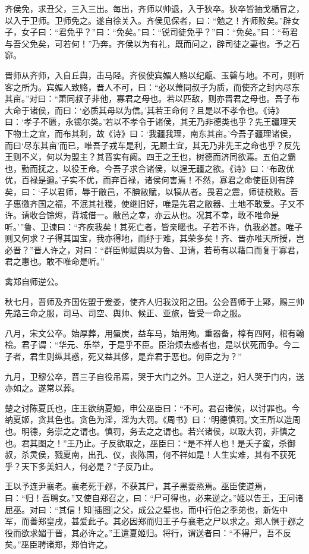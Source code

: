 \documentclass[a4paper,12pt,UTF8,twoside]{ctexbook}
\begin{document}
齐侯免，求丑父，三入三出。每出，齐师以帅退，入于狄卒。狄卒皆抽戈楯冒之，以入于卫师。卫师免之。遂自徐关入。齐侯见保者，曰：“勉之！齐师败矣。”辟女子，女子曰：“君免乎？”曰：“免矣。”曰：“锐司徒免乎？”曰：“免矣。”曰：“苟君与吾父免矣，可若何！”乃奔。齐侯以为有礼，既而问之，辟司徒之妻也。予之石窌。

晋师从齐师，入自丘舆，击马陉。齐侯使宾媚人赂以纪甗、玉磬与地。不可，则听客之所为。宾媚人致赂，晋人不可，曰：“必以萧同叔子为质，而使齐之封内尽东其亩。”对曰：“萧同叔子非他，寡君之母也。若以匹敌，则亦晋君之母也。吾子布大命于诸侯，而曰：‘必质其母以为信。’其若王命何？且是以不孝令也。《诗》曰：‘孝子不匮，永锡尔类。’若以不孝令于诸侯，其无乃非德类也乎？先王疆理天下物土之宜，而布其利，故《诗》曰：‘我疆我理，南东其亩。’今吾子疆理诸侯，而曰‘尽东其亩’而已，唯吾子戎车是利，无顾土宜，其无乃非先王之命也乎？反先王则不义，何以为盟主？其晋实有阙。四王之王也，树德而济同欲焉。五伯之霸也，勤而抚之，以役王命。今吾子求合诸侯，以逞无疆之欲。《诗》曰：‘布政优优，百禄是遒。’子实不优，而弃百禄，诸侯何害焉！不然，寡君之命使臣则有辞矣，曰：‘子以君师，辱于敝邑，不腆敝赋，以犒从者。畏君之震，师徒桡败。吾子惠徼齐国之福，不泯其社稷，使继旧好，唯是先君之敝器、土地不敢爱。子又不许。请收合馀烬，背城借一。敝邑之幸，亦云从也。况其不幸，敢不唯命是听。’”鲁、卫谏曰：“齐疾我矣！其死亡者，皆亲暱也。子若不许，仇我必甚。唯子则又何求？子得其国宝，我亦得地，而纾于难，其荣多矣！齐、晋亦唯天所授，岂必晋？”晋人许之，对曰：“群臣帅赋舆以为鲁、卫请，若苟有以藉口而复于寡君，君之惠也。敢不唯命是听。”

禽郑自师逆公。

秋七月，晋师及齐国佐盟于爰娄，使齐人归我汶阳之田。公会晋师于上鄍，赐三帅先路三命之服，司马、司空、舆帅、候正、亚旅，皆受一命之服。

八月，宋文公卒。始厚葬，用蜃炭，益车马，始用殉。重器备，椁有四阿，棺有翰桧。君子谓：“华元、乐举，于是乎不臣。臣治烦去惑者也，是以伏死而争。今二子者，君生则纵其惑，死又益其侈，是弃君于恶也。何臣之为？”

九月，卫穆公卒，晋三子自役吊焉，哭于大门之外。卫人逆之，妇人哭于门内，送亦如之。遂常以葬。

楚之讨陈夏氏也，庄王欲纳夏姬，申公巫臣曰：“不可。君召诸侯，以讨罪也。今纳夏姬，贪其色也。贪色为淫，淫为大罚。《周书》曰：‘明德慎罚。’文王所以造周也。明德，务崇之之谓也。慎罚，务去之之谓也。若兴诸侯，以取大罚，非慎之也。君其图之！”王乃止。子反欲取之，巫臣曰：“是不祥人也！是夭子蛮，杀御叔，杀灵侯，戮夏南，出孔、仪，丧陈国，何不祥如是！人生实难，其有不获死乎？天下多美妇人，何必是？”子反乃止。

王以予连尹襄老。襄老死于邲，不获其尸，其子黑要烝焉。巫臣使道焉，曰：“归！吾聘女。”又使自郑召之，曰：“尸可得也，必来逆之。”姬以告王，王问诸屈巫。对曰：“其信！知[插图]之父，成公之嬖也，而中行伯之季弟也，新佐中军，而善郑皇戌，甚爱此子。其必因郑而归王子与襄老之尸以求之。郑人惧于邲之役而欲求媚于晋，其必许之。”王遣夏姬归。将行，谓送者曰：“不得尸，吾不反矣。”巫臣聘诸郑，郑伯许之。
\end{document}

